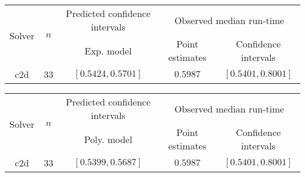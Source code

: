 \begin{tabular}{ccccc}
\hline 
\multirow{2}{*}{Solver} & \multirow{2}{*}{$n$} & Predicted confidence intervals & \multicolumn{2}{c}{Observed median  run-time}\tabularnewline
 &  & Exp. model  & Point estimates  & Confidence intervals\tabularnewline
\hline 
\hline 
\multirow{0}{*}{c2d} & 33 & $\mathbf{\left[0.5424,0.5701\right]}$ & $0.5987$ & $\left[0.5401,0.8001\right]$ \tabularnewline 
\hline 
\end{tabular} 

\begin{tabular}{ccccc}
\hline 
\multirow{2}{*}{Solver} & \multirow{2}{*}{$n$} & Predicted confidence intervals & \multicolumn{2}{c}{Observed median  run-time}\tabularnewline
 &  & Poly. model  & Point estimates  & Confidence intervals\tabularnewline
\hline 
\hline 
\multirow{0}{*}{c2d} & 33 & $\mathbf{\left[0.5399,0.5687\right]}$ & $0.5987$ & $\left[0.5401,0.8001\right]$ \tabularnewline 
\hline 
\end{tabular} 


